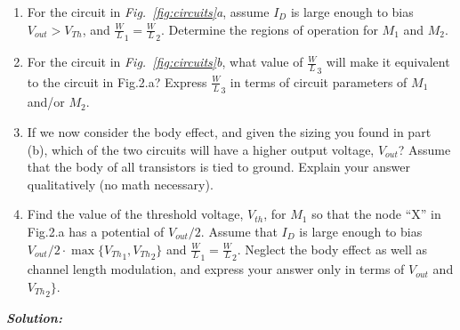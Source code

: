 \documentclass[12pt, fleqn]{article}
\begin{document}
\begin{enumerate}[label=(\alph*)]
    \item{For the circuit in \textit{Fig.~\ref{fig:circuits}a}, assume $I_D$ is large enough to bias $V_{out} > V_{Th}$, and ${\frac{W}{L}}_1 = {\frac{W}{L}}_2$. Determine the regions of operation for $M_1$ and $M_2$.}
    \item{For the circuit in \textit{Fig.~\ref{fig:circuits}b}, what value of ${\frac{W}{L}}_3$ will make it equivalent to the circuit in Fig.2.a? Express ${\frac{W}{L}}_3$ in terms of circuit parameters of $M_1$ and/or $M_2$.}
    \item{If we now consider the body eﬀect, and given the sizing you found in part (b), which of the two circuits will have a higher output voltage, $V_{out}$? Assume that the body of all transistors is tied to ground. Explain your answer qualitatively (no math necessary).}
    \item{Find the value of the threshold voltage, $V_{th}$, for $M_1$ so that the node “X” in Fig.2.a has a potential of $V_{out} / 2$. Assume that $I_D$ is large enough to bias $V_{out} / 2 \cdot \max\{{V_{Th}}_1, {V_{Th}}_2\}$ and ${\frac{W}{L}}_1 = {\frac{W}{L}}_2$. Neglect the body eﬀect as well as channel length modulation, and express your answer only in terms of $V_{out}$ and ${V_{Th}}_2\}$.}
\end{enumerate}

\newpage\noindent
\textbf{\emph{Solution: }}
\end{document}
